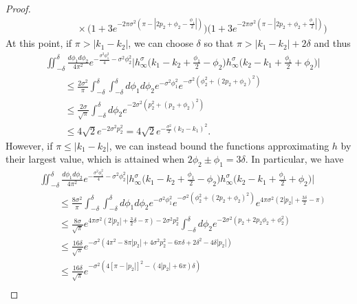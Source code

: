 \documentclass[../thesis-main/thesis-main]{subfiles}
\begin{document}
\begin{proof}
\begin{align}
    &\qquad\qquad \times\big( 1 + 3 e^{ - 2 \pi \sigma^2 ( \pi - | 2 p_2 + \phi_2 - \frac{\phi_1}{2} | )}\big) \big( 1 + 3 e^{ - 2 \pi \sigma^2 ( \pi - | 2 p_2 + \phi_2 + \frac{\phi_1}{2} | )}\big) 
\end{align}
At this point, if $\pi > |k_1-k_2|$, we can choose $\delta$ so that $\pi > |k_1-k_2| + 2\delta$ and thus 
\begin{align}
 &\iint_{-\delta}^\delta \frac{d\phi_1d\phi_2}{4\pi^2} e^{ - \frac{\sigma^2\phi_1^2}{4} - \sigma^2 \phi_2^2}\bigg| h_\infty^\sigma \Big(k_1 -k_2 +\frac{\phi_1}{2} - \phi_2\Big) h_\infty^\sigma \Big(k_2 - k_1 + \frac{\phi_1}{2} + \phi_2\Big)\bigg|\nonumber\\
&\qquad \leq \frac{2\sigma^2}{\pi}\int_{-\delta}^\delta \int_{-\delta}^\delta {d\phi_1 d\phi_2}  e^{- \sigma^2 \phi_1^2}e^{-\sigma^2 (\phi_2^2 + (2p_2 + \phi_2)^2)}\\
    & \qquad \leq \frac{2 \sigma}{\sqrt{\pi}} \int_{-\delta}^\delta d\phi_2 e^{ - 2\sigma^2 ( p_2^2 + (p_2 + \phi_2)^2)}\\
    &\qquad \leq 4\sqrt{2} e^{ -2 \sigma^2 p_2^2} = 4\sqrt{2} e^{-\frac{\sigma^2}{2} (k_2-k_1)^2}.
\end{align}
However, if $\pi \leq |k_1 -k_2|$, we can instead bound the functions approximating $h$ by their largest value, which is attained when $2\phi_2 \pm \phi_1 = 3 \delta$.  In particular, we have
\begin{align}
    &\iint_{-\delta}^\delta \frac{d\phi_1d\phi_2}{4\pi^2} e^{ - \frac{\sigma^2\phi_1^2}{4} - \sigma^2 \phi_2^2}\bigg| h_\infty^\sigma \Big(k_1 -k_2 +\frac{\phi_1}{2} - \phi_2\Big) h_\infty^\sigma \Big(k_2 - k_1 + \frac{\phi_1}{2} + \phi_2\Big)\bigg|\nonumber\\
&  \qquad \leq \frac{8\sigma^2}{\pi}\int_{-\delta}^\delta \int_{-\delta}^\delta {d\phi_1 d\phi_2}  e^{- \sigma^2 \phi_1^2}e^{-\sigma^2 (\phi_2^2 + (2p_2 + \phi_2)^2)} e^{ 4 \pi \sigma^2 ( 2|p_2| + \frac{3\delta}{2} - \pi)} \\
    & \qquad \leq \frac{8 \sigma}{\sqrt{\pi}} e^{4\pi \sigma^2 (2|p_2| + \frac{3}{2}\delta -\pi) - 2 \sigma^2 p_2^2 } \int_{-\delta}^\delta d\phi_2 e^{ -2\sigma^2( p_2 + 2 p_2 \phi_2 + \phi_2^2)}\\
    &\qquad \leq \frac{16\delta}{\sqrt{\pi}}e^{-\sigma^2 ( 4\pi^2  - 8 \pi |p_2|  + 4 \sigma^2 p_2^2 - 6 \pi \delta + 2\delta^2 - 4 \delta |p_2| )}\\
    & \qquad \leq \frac{16 \delta}{\sqrt{\pi}} e^{ -\sigma^2 (4 [\pi - |p_2|]^2 - (4|p_2| + 6\pi)\delta)}\\

\end{align}
\end{proof}
\end{document}
